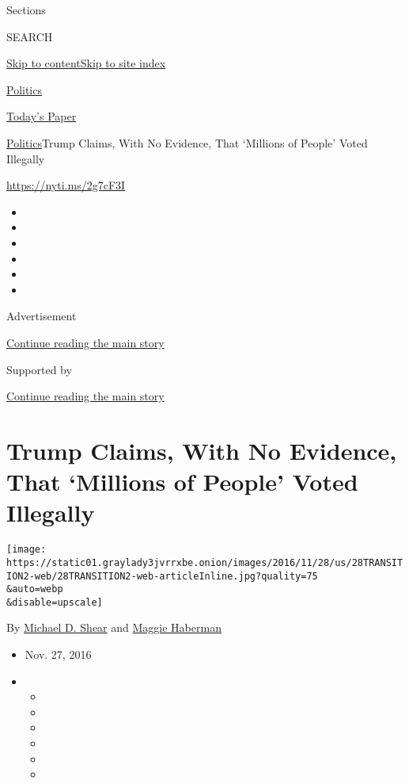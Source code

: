 Sections

SEARCH

\protect\hyperlink{site-content}{Skip to
content}\protect\hyperlink{site-index}{Skip to site index}

\href{https://www.nytimes3xbfgragh.onion/section/politics}{Politics}

\href{https://myaccount.nytimes3xbfgragh.onion/auth/login?response_type=cookie\&client_id=vi}{}

\href{https://www.nytimes3xbfgragh.onion/section/todayspaper}{Today's
Paper}

\href{/section/politics}{Politics}\textbar{}Trump Claims, With No
Evidence, That `Millions of People' Voted Illegally

\url{https://nyti.ms/2g7cF3I}

\begin{itemize}
\item
\item
\item
\item
\item
\item
\end{itemize}

Advertisement

\protect\hyperlink{after-top}{Continue reading the main story}

Supported by

\protect\hyperlink{after-sponsor}{Continue reading the main story}

\hypertarget{trump-claims-with-no-evidence-that-millions-of-people-voted-illegally}{%
\section{Trump Claims, With No Evidence, That `Millions of People' Voted
Illegally}\label{trump-claims-with-no-evidence-that-millions-of-people-voted-illegally}}

\texttt{[image: https://static01.graylady3jvrrxbe.onion/images/2016/11/28/us/28TRANSITION2-web/28TRANSITION2-web-articleInline.jpg?quality=75\\\&auto=webp\\\&disable=upscale]}

By \href{http://www.nytimes3xbfgragh.onion/by/michael-d-shear}{Michael
D. Shear} and
\href{http://www.nytimes3xbfgragh.onion/by/maggie-haberman}{Maggie
Haberman}

\begin{itemize}
\item
  Nov. 27, 2016
\item
  \begin{itemize}
  \item
  \item
  \item
  \item
  \item
  \item
  \end{itemize}
\end{itemize}

